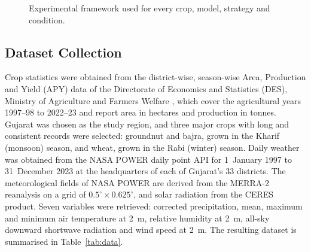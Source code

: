 \begin{figure}[!t]
\centering
{}
\caption{Experimental framework used for every crop, model, strategy and condition.}
\label{fig:framework}
\end{figure}

\subsection{Dataset Collection}\label{sec:data}

Crop statistics were obtained from the district-wise, season-wise Area, Production and Yield (APY)
data of the Directorate of Economics and Statistics (DES), Ministry of Agriculture and Farmers
Welfare \cite{desapy}, which cover the agricultural years 1997--98 to 2022--23 and report area in
hectares and production in tonnes. Gujarat was chosen as the study region, and three major crops
with long and consistent records were selected: groundnut and bajra, grown in the Kharif
(monsoon) season, and wheat, grown in the Rabi (winter) season. Daily weather was obtained from the
NASA POWER daily point API \cite{nasapower} for 1~January 1997 to 31~December 2023 at the
headquarters of each of Gujarat's 33 districts. The meteorological fields of NASA POWER are derived
from the MERRA-2 reanalysis on a grid of $0.5^\circ \times 0.625^\circ$, and solar radiation from
the CERES product. Seven variables were retrieved: corrected precipitation, mean, maximum and
minimum air temperature at 2~m, relative humidity at 2~m, all-sky downward shortwave radiation and
wind speed at 2~m. The resulting dataset is summarised in Table~\ref{tab:data}.

